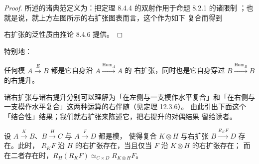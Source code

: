 \begin{proof}
所述的诸典范\trCell{}定义为：把定理 8.4.4 的双射作用于命题 8.2.1 的诸限制%
\trCell{}；也就是说，就上方左图所示的右扩张图表而言，这个\trCell{}作为如下
复合而得到
\begin{center}
\end{center}
右扩张的泛性质由推论 8.4.6 提供。
\end{proof}

特别地：

\begin{corollary}\label{cor:module-self-extension}
任何模 $A\xrightarrow{E}B$ 都是它自身沿 $A\xrightarrow{\mathrm{Hom}_{A}}A$ 的
右扩张，同时也是它自身穿过 $B\xrightarrow{\mathrm{Hom}_{B}}B$ 的右提升。
\end{corollary}

诸右扩张与诸右提升分别可以理解为「在左侧与一支模作水平复合」和「在右侧与
一支模作水平复合」这两种运算的右伴随（见定理 12.3.6）。
由此引出下面这个「结合性」结果；我们就右扩张来陈述它，把右提升的对偶结果
留给读者。

\begin{proposition}\label{prop:right-extension-associativity}
设 $A\xrightarrow{K}B$、$B\xrightarrow{H}C$ 与 $A\xrightarrow{F}D$ 都是模，
使得复合 $K\otimes H$ 与右扩张 $B\xrightarrow{R_{K}F}D$ 存在。此时，
$R_{K}F$ 沿 $H$ 的右扩张存在，当且仅当 $F$ 沿 $K\otimes H$ 的右扩张存在；
而在二者存在时，$R_{H}(R_{K}F)\simeq_{C\times D}R_{K\otimes H}F$。
\end{proposition}

